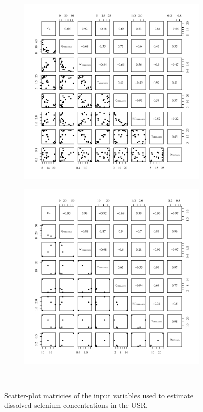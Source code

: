 \subfiguremid
\begin{landscape}
	\begin{figure}
		\begin{subfigure}{0.7\textwidth}
			\centering
			\includegraphics[width=\tableCustomSize]{"Figures/Results_USR/Stochastic/Conc Model Full PairsTIM"}
		\end{subfigure}%
		\begin{subfigure}{0.7\textwidth}
			\centering			
			\includegraphics[width=\tableCustomSize]{"Figures/Results_USR/Stochastic/Conc Model Full PairsHRC"}
		\end{subfigure}\\
		\caption{Scatter-plot matricies of the input variables used to estimate dissolved selenium concentrations in the USR.}
	\end{figure}
\end{landscape}
